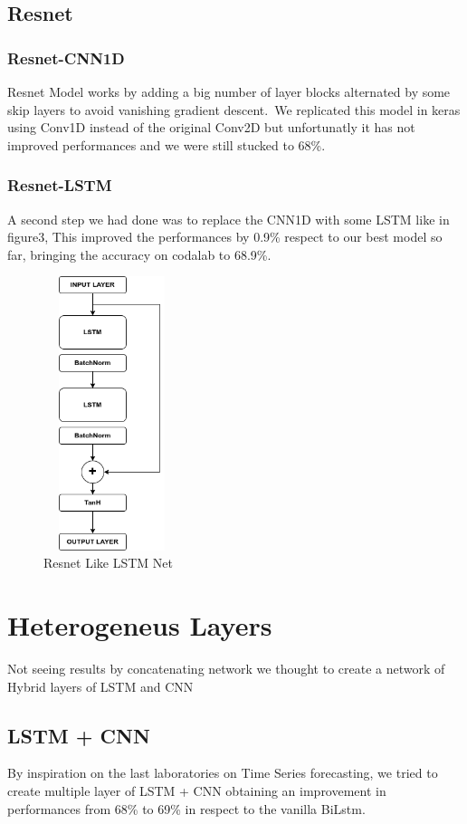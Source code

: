 \documentclass[11pt]{article}
\begin{document}
\subsection{Resnet}
\subsubsection{Resnet-CNN1D}
Resnet Model works by adding a big number of layer blocks alternated by some skip layers to avoid vanishing gradient descent.\
We replicated this model in keras using Conv1D instead of the original Conv2D but unfortunatly it has not improved performances and we were still stucked to 68\%.
\subsubsection{Resnet-LSTM}
A second step we had done was to replace the CNN1D with some LSTM like in figure3,
This improved the performances by 0.9\% respect to our best model so far, bringing the accuracy on codalab to 68.9\%.
\begin{figure}[h]
\centering
\includegraphics[width=4cm, height=8cm,angle =90]{resnet}
\caption{Resnet Like LSTM Net}
\end{figure}

\section{Heterogeneus Layers}
Not seeing results by concatenating network we thought to create a network of Hybrid layers of LSTM and CNN
\subsection{LSTM + CNN}
By inspiration on the last laboratories on Time Series forecasting, we tried to create multiple layer of LSTM + CNN
obtaining an improvement in performances from 68\% to 69\% in respect to the vanilla BiLstm.
\end{document}
